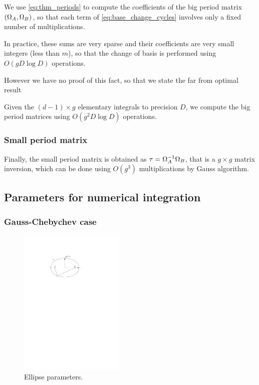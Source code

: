 \documentclass[main.tex]{subfiles}
\begin{document}
   We use \eqref{eq:thm_periods} to compute the coefficients of the big period
   matrix $(\Omega_A,\Omega_B)$, so that each term of \eqref{eq:base_change_cycles}
   involves only a fixed number of multiplications.

   In practice, these sums are very sparse and their coefficients are very small integers
   (less than $m$), so that the change of basis is performed using $O(gD\log D)$ operations.

   However we have no proof of this fact, so that we state the far from optimal
   result
   \begin{thm}
       Given the $(d-1)\times g$ elementary integrals to precision $D$,
       we compute the big period matrices using $O(g^2D\log D)$ operations.
   \end{thm}

   \subsubsection{Small period matrix}

   Finally, the small period matrix is obtained as $\tau=\Omega_A^{-1}\Omega_B$,
   that is a $g\times g$ matrix inversion, which can be done using
   $O(g^3)$ multiplications by Gauss algorithm.

 \subsection{Parameters for numerical integration}

  \subsubsection{Gauss-Chebychev case}

  \begin{figure}[H] \begin{center}
      \includegraphics[width=5cm]{images/ellipse.pdf}
  \end{center} \caption{Ellipse parameters.}
  \label{fig:ellipse} \end{figure}
\end{document}
